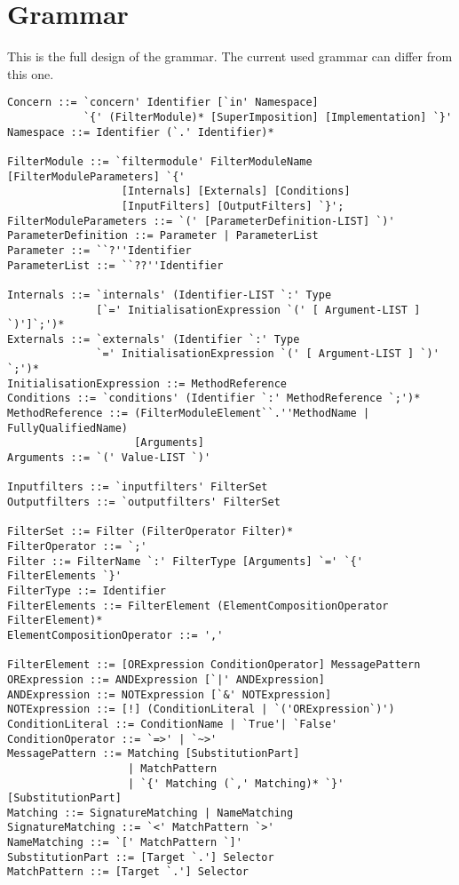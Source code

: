 \chapter{Grammar}
This is the full design of the grammar. The current used grammar can differ from this one.
\begin{lstlisting}[label=lst::proposedgrammar,style=listing,language=ebnf]
Concern ::= `concern' Identifier [`in' Namespace]
            `{' (FilterModule)* [SuperImposition] [Implementation] `}'
Namespace ::= Identifier (`.' Identifier)*

FilterModule ::= `filtermodule' FilterModuleName [FilterModuleParameters] `{'
                  [Internals] [Externals] [Conditions]
                  [InputFilters] [OutputFilters] `}';
FilterModuleParameters ::= `(' [ParameterDefinition-LIST] `)'
ParameterDefinition ::= Parameter | ParameterList
Parameter ::= ``?''Identifier
ParameterList ::= ``??''Identifier

Internals ::= `internals' (Identifier-LIST `:' Type 
              [`=' InitialisationExpression `(' [ Argument-LIST ] `)']`;')*
Externals ::= `externals' (Identifier `:' Type 
              `=' InitialisationExpression `(' [ Argument-LIST ] `)' `;')* 
InitialisationExpression ::= MethodReference
Conditions ::= `conditions' (Identifier `:' MethodReference `;')*
MethodReference ::= (FilterModuleElement``.''MethodName | FullyQualifiedName)
                    [Arguments]
Arguments ::= `(' Value-LIST `)'

Inputfilters ::= `inputfilters' FilterSet
Outputfilters ::= `outputfilters' FilterSet

FilterSet ::= Filter (FilterOperator Filter)*
FilterOperator ::= `;'
Filter ::= FilterName `:' FilterType [Arguments] `=' `{' FilterElements `}'
FilterType ::= Identifier
FilterElements ::= FilterElement (ElementCompositionOperator FilterElement)*
ElementCompositionOperator ::= ','

FilterElement ::= [ORExpression ConditionOperator] MessagePattern
ORExpression ::= ANDExpression [`|' ANDExpression]
ANDExpression ::= NOTExpression [`&' NOTExpression]
NOTExpression ::= [!] (ConditionLiteral | `('ORExpression`)')
ConditionLiteral ::= ConditionName | `True'| `False'
ConditionOperator ::= `=>' | `~>'
MessagePattern ::= Matching [SubstitutionPart]
                   | MatchPattern
                   | `{' Matching (`,' Matching)* `}' [SubstitutionPart] 
Matching ::= SignatureMatching | NameMatching
SignatureMatching ::= `<' MatchPattern `>'
NameMatching ::= `[' MatchPattern `]'
SubstitutionPart ::= [Target `.'] Selector
MatchPattern ::= [Target `.'] Selector


\end{lstlisting}
